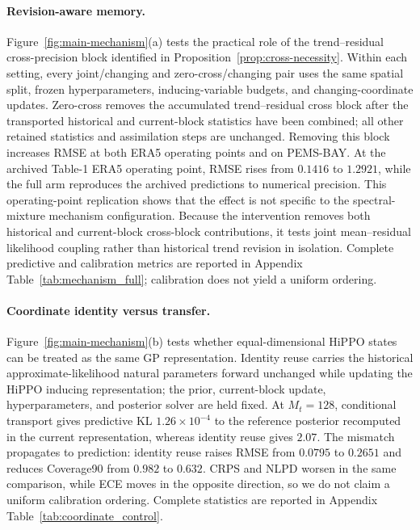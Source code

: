 \documentclass[twoside]{article}
\begin{document}
\paragraph{Revision-aware memory.}
Figure~\ref{fig:main-mechanism}(a) tests the practical role of the trend--residual cross-precision block identified in Proposition~\ref{prop:cross-necessity}. Within each setting, every joint/changing and zero-cross/changing pair uses the same spatial split, frozen hyperparameters, inducing-variable budgets, and changing-coordinate updates. Zero-cross removes the accumulated trend--residual cross block after the transported historical and current-block statistics have been combined; all other retained statistics and assimilation steps are unchanged. Removing this block increases RMSE at both ERA5 operating points and on PEMS-BAY. At the archived Table-1 ERA5 operating point, RMSE rises from $0.1416$ to $1.2921$, while the full arm reproduces the archived predictions to numerical precision. This operating-point replication shows that the effect is not specific to the spectral-mixture mechanism configuration. Because the intervention removes both historical and current-block cross-block contributions, it tests joint mean--residual likelihood coupling rather than historical trend revision in isolation. Complete predictive and calibration metrics are reported in Appendix Table~\ref{tab:mechanism_full}; calibration does not yield a uniform ordering.

\paragraph{Coordinate identity versus transfer.}
Figure~\ref{fig:main-mechanism}(b) tests whether equal-dimensional HiPPO states can be treated as the same GP representation. Identity reuse carries the historical approximate-likelihood natural parameters forward unchanged while updating the HiPPO inducing representation; the prior, current-block update, hyperparameters, and posterior solver are held fixed. At $M_t=128$, conditional transport gives predictive KL $1.26\times10^{-4}$ to the reference posterior recomputed in the current representation, whereas identity reuse gives $2.07$. The mismatch propagates to prediction: identity reuse raises RMSE from $0.0795$ to $0.2651$ and reduces Coverage90 from $0.982$ to $0.632$. CRPS and NLPD worsen in the same comparison, while ECE moves in the opposite direction, so we do not claim a uniform calibration ordering. Complete statistics are reported in Appendix Table~\ref{tab:coordinate_control}.
\end{document}
